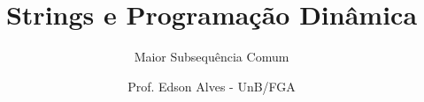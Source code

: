 \title{Strings e Programação Dinâmica}
\subtitle{Maior Subsequência Comum}
\author{Prof. Edson Alves - UnB/FGA}
\date{}
